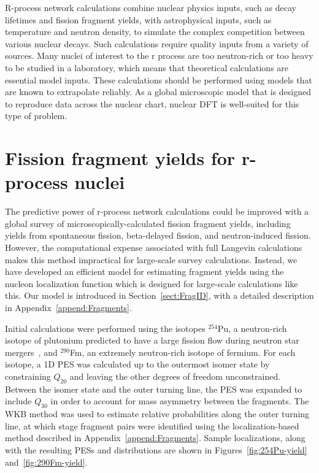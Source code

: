 R-process network calculations combine nuclear physics inputs, such as decay lifetimes and fission fragment yields, with astrophysical inputs, such as temperature and neutron density, to simulate the complex competition between various nuclear decays. Such calculations require quality inputs from a variety of sources. Many nuclei of interest to the r process are too neutron-rich or too heavy to be studied in a laboratory, which means that theoretical calculations are essential model inputs. These calculations should be performed using models that are known to extrapolate reliably. As a global microscopic model that is designed to reproduce data across the nuclear chart, nuclear DFT is well-suited for this type of problem.

\section{Fission fragment yields for r-process nuclei}
The predictive power of r-process network calculations could be improved with a global survey of microscopically-calculated fission fragment yields, including yields from spontaneous fission, beta-delayed fission, and neutron-induced fission. However, the computational expense associated with full Langevin calculations makes this method impractical for large-scale survey calculations. Instead, we have developed an efficient model for estimating fragment yields using the nucleon localization function which is designed for large-scale calculations like this. Our model is introduced in Section~\ref{sect:FragID}, with a detailed description in Appendix~\ref{append:Fragments}.


Initial calculations were performed using the isotopes $^{254}$Pu, a neutron-rich isotope of plutonium predicted to have a large fission flow during neutron star mergers~\cite{Vassh2019}, and $^{290}$Fm, an extremely neutron-rich isotope of fermium. For each isotope, a 1D PES was calculated up to the outermost isomer state by constraining $Q_{20}$ and leaving the other degrees of freedom unconstrained. Between the isomer state and the outer turning line, the PES was expanded to include $Q_{30}$ in order to account for mass asymmetry between the fragments. The WKB method was used to estimate relative probabilities along the outer turning line, at which stage fragment pairs were identified using the localization-based method described in Appendix~\ref{append:Fragments}. Sample localizations, along with the resulting PESs and distributions are shown in Figures~\ref{fig:254Pu-yield} and~\ref{fig:290Fm-yield}.

